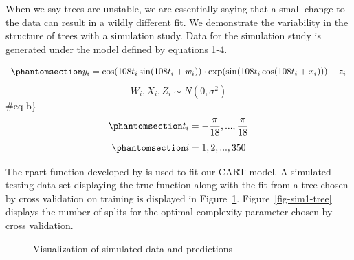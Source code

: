 \documentclass[
  12pt,
  letterpaper,
  DIV=11,
  numbers=noendperiod]{scrartcl}
\begin{document}
When we say trees are unstable, we are essentially saying that a small
change to the data can result in a wildly different fit. We demonstrate
the variability in the structure of trees with a simulation study. Data
for the simulation study is generated under the model defined by
equations 1-4.

\begin{equation}\phantomsection\label{eq-a}{y_i=\cos(108t_i\sin(108t_i+w_i))\cdot\exp(\sin(108t_i\cos(108t_i+x_i)))+z_i}\end{equation}
\[W_i,X_i,Z_i\sim N(0,\sigma^2)\] \#eq-b\}
\begin{equation}\phantomsection\label{eq-c}{t_i=-\frac{\pi}{18},...,\frac{\pi}{18}}\end{equation}
\begin{equation}\phantomsection\label{eq-d}{i=1,2,...,350}\end{equation}

The rpart function developed by \cite{rpart} is used to fit our CART
model. A simulated testing data set displaying the true function along
with the fit from a tree chosen by cross validation on training is
displayed in Figure~\ref{fig-sim1-pred-vis}. Figure~\ref{fig-sim1-tree}
displays the number of splits for the optimal complexity parameter
chosen by cross validation.

\begin{figure}[H]


\caption{\label{fig-sim1-pred-vis}Visualization of simulated data and
predictions}

\end{figure}%
\end{document}
